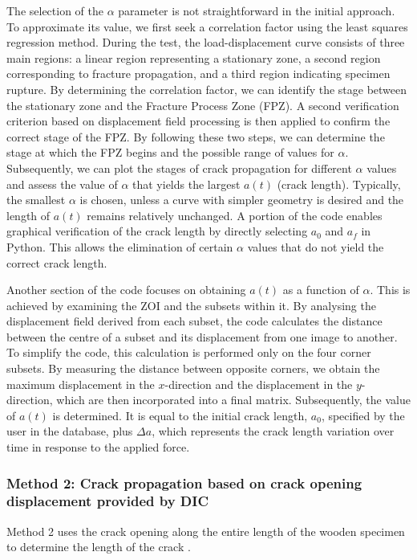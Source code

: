 \documentclass[3p,times,procedia]{elsarticle}
\begin{document}
The selection of the $\alpha$ parameter is not straightforward in the initial approach. To approximate its value, we first seek a correlation factor using the least squares regression method. During the test, the load-displacement curve consists of three main regions: a linear region representing a stationary zone, a second region corresponding to fracture propagation, and a third region indicating specimen rupture. By determining the correlation factor, we can identify the stage between the stationary zone and the Fracture Process Zone (FPZ). A second verification criterion based on displacement field processing is then applied to confirm the correct stage of the FPZ. By following these two steps, we can determine the stage at which the FPZ begins and the possible range of values for $\alpha$. Subsequently, we can plot the stages of crack propagation for different $\alpha$ values and assess the value of $\alpha$ that yields the largest $a(t)$ (crack length). Typically, the smallest $\alpha$ is chosen, unless a curve with simpler geometry is desired and the length of $a(t)$ remains relatively unchanged. A portion of the code enables graphical verification of the crack length by directly selecting $a_0$ and $a_f$ in Python. This allows the elimination of certain $\alpha$ values that do not yield the correct crack length.

Another section of the code focuses on obtaining $a(t)$ as a function of $\alpha$. This is achieved by examining the ZOI and the subsets within it. By analysing the displacement field derived from each subset, the code calculates the distance between the centre of a subset and its displacement from one image to another. To simplify the code, this calculation is performed only on the four corner subsets. By measuring the distance between opposite corners, we obtain the maximum displacement in the $x$-direction and the displacement in the $y$-direction, which are then incorporated into a final matrix. Subsequently, the value of $a(t)$ is determined. It is equal to the initial crack length, $a_0$, specified by the user in the database, plus $\Delta a$, which represents the crack length variation over time in response to the applied force.

\subsubsection{Method 2: Crack propagation based on crack opening displacement provided by DIC}

Method 2 uses the crack opening along the entire length of the wooden specimen to determine the length of the crack \citep{FilhoJ2022}.
\end{document}
